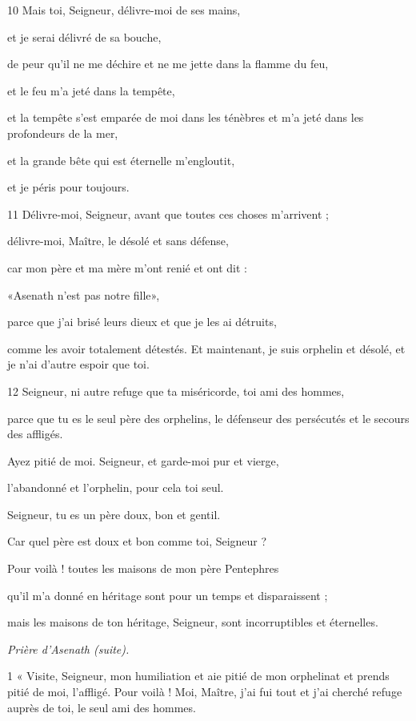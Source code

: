 \par 10 Mais toi, Seigneur, délivre-moi de ses mains,
\par et je serai délivré de sa bouche,
\par de peur qu'il ne me déchire et ne me jette dans la flamme du feu,
\par et le feu m'a jeté dans la tempête,
\par et la tempête s'est emparée de moi dans les ténèbres et m'a jeté dans les profondeurs de la mer,
\par et la grande bête qui est éternelle m'engloutit,
\par et je péris pour toujours.

\par 11 Délivre-moi, Seigneur, avant que toutes ces choses m'arrivent ;
\par délivre-moi, Maître, le désolé et sans défense,
\par car mon père et ma mère m'ont renié et ont dit :
\par «Asenath n'est pas notre fille»,
\par parce que j'ai brisé leurs dieux et que je les ai détruits,
\par comme les avoir totalement détestés. Et maintenant, je suis orphelin et désolé, et je n'ai d'autre espoir que toi.

\par 12 Seigneur, ni autre refuge que ta miséricorde, toi ami des hommes,
\par parce que tu es le seul père des orphelins, le défenseur des persécutés et le secours des affligés.
\par Ayez pitié de moi. Seigneur, et garde-moi pur et vierge,
\par l'abandonné et l'orphelin, pour cela toi seul.
\par Seigneur, tu es un père doux, bon et gentil.
\par Car quel père est doux et bon comme toi, Seigneur ?
\par Pour voilà ! toutes les maisons de mon père Pentephres
\par qu'il m'a donné en héritage sont pour un temps et disparaissent ;
\par mais les maisons de ton héritage, Seigneur, sont incorruptibles et éternelles.


\par \textit{Prière d'Asenath (suite).}

\par 1 « Visite, Seigneur, mon humiliation et aie pitié de mon orphelinat et prends pitié de moi, l'affligé. Pour voilà ! Moi, Maître, j'ai fui tout et j'ai cherché refuge auprès de toi, le seul ami des hommes.

